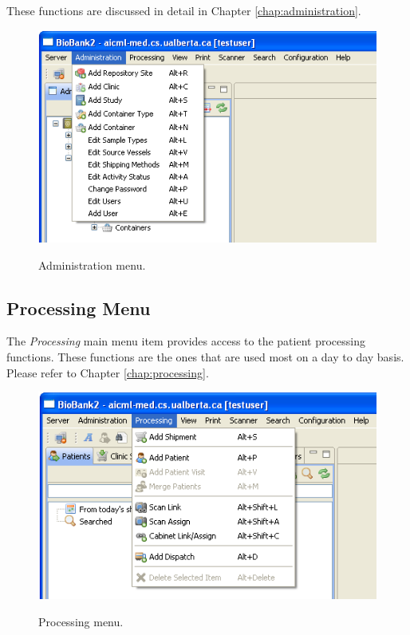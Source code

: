 These functions are discussed in detail in Chapter \ref{chap:administration}.
    \begin{figure}[H]
      \centering
      \scalebox{0.5}
      { \includegraphics*{screenshots/overview/main_menu_administration} }
      \caption{Administration menu.}
      \label{fig:main_menu_administration}
    \end{figure}

\subsection{Processing Menu}
The \emph{Processing} main menu item provides access to the patient processing
functions. These functions are the ones that are used most on a day to day
basis. Please refer to Chapter \ref{chap:processing}.
    \begin{figure}[H]
      \centering
      \scalebox{0.5}
      { \includegraphics*{screenshots/overview/main_menu_processing} }
      \caption{Processing menu.}
      \label{fig:main_menu_processing}
    \end{figure}


